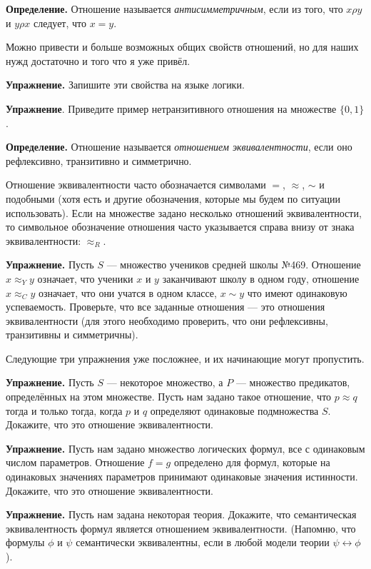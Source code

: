 {\bfseries Определение.} Отношение называется {\slshape антисимметричным}, если из того, что $x \rho y$ и $y \rho x$ следует, что $x = y$.

Можно привести и больше возможных общих свойств отношений, но для наших нужд достаточно и того что я уже привёл.

{\bfseries Упражнение.} Запишите эти свойства на языке логики.

{\bfseries Упражнение}. Приведите пример нетранзитивного отношения на множестве $\{0, 1\}$.

{\bfseries Определение.} Отношение называется {\slshape отношением эквивалентности}, если оно рефлексивно, транзитивно и симметрично.

Отношение эквивалентности часто обозначается символами $=$, $\approx$, $\sim$ и подобными (хотя есть и другие обозначения, которые мы будем по ситуации использовать). Если на множестве задано несколько отношений эквивалентности, то символьное обозначение отношения часто указывается справа внизу от знака эквивалентности: $\approx_R$.

{\bfseries Упражнение.} Пусть $S$ — множество учеников средней школы №469. Отношение $x\approx_Y y$ означает, что ученики $x$ и $y$ заканчивают школу в одном году, отношение $x \approx_C y$ означает, что они учатся в одном классе, $x \sim y$ что имеют одинаковую успеваемость. Проверьте, что все заданные отношения — это отношения эквивалентности (для этого необходимо проверить, что они рефлексивны, транзитивны и симметричны).

Следующие три упражнения уже посложнее, и их начинающие могут пропустить.

{\bfseries Упражнение.} Пусть $S$ — некоторое множество, а $P$ — множество предикатов, определённых на этом множестве. Пусть нам задано такое отношение, что $p \approx q$ тогда и только тогда, когда $p$ и $q$ определяют одинаковые подмножества $S$. Докажите, что это отношение эквивалентности.

{\bfseries Упражнение.} Пусть нам задано множество логических формул, все с одинаковым числом параметров. Отношение $f=g$ определено для формул, которые на одинаковых значениях параметров принимают одинаковые значения истинности. Докажите, что это отношение эквивалентности.

{\bfseries Упражнение.} Пусть нам задана некоторая теория. Докажите, что семантическая эквивалентность формул является отношением эквивалентности. (Напомню, что формулы $\phi$ и $\psi$ семантически эквивалентны, если в любой модели теории $\psi\leftrightarrow\phi$).

